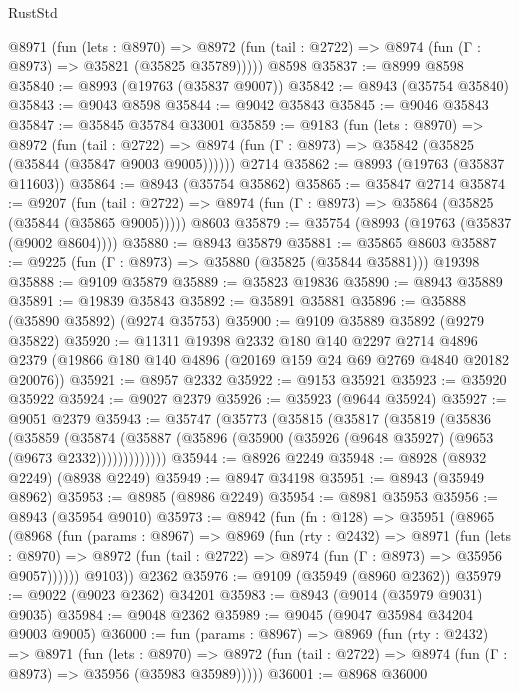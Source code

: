 \begin{lexlean}{RustStd}
\begin{coremodule}
    @8971
      (fun (lets : @8970) =>
      @8972 (fun (tail : @2722) => @8974 (fun (Γ : @8973) => @35821 (@35825 @35789)))))
    @8598
@35837 := @8999 @8598
@35840 := @8993 (@19763 (@35837 @9007))
@35842 := @8943 (@35754 @35840)
@35843 := @9043 @8598
@35844 := @9042 @35843
@35845 := @9046 @35843
@35847 := @35845 @35784 @33001
@35859 := @9183
    (fun (lets : @8970) =>
    @8972
      (fun (tail : @2722) =>
      @8974 (fun (Γ : @8973) => @35842 (@35825 (@35844 (@35847 @9003 @9005))))))
    @2714
@35862 := @8993 (@19763 (@35837 @11603))
@35864 := @8943 (@35754 @35862)
@35865 := @35847 @2714
@35874 := @9207
    (fun (tail : @2722) => @8974 (fun (Γ : @8973) => @35864 (@35825 (@35844 (@35865 @9005)))))
    @8603
@35879 := @35754 (@8993 (@19763 (@35837 (@9002 @8604))))
@35880 := @8943 @35879
@35881 := @35865 @8603
@35887 := @9225 (fun (Γ : @8973) => @35880 (@35825 (@35844 @35881))) @19398
@35888 := @9109 @35879
@35889 := @35823 @19836
@35890 := @8943 @35889
@35891 := @19839 @35843
@35892 := @35891 @35881
@35896 := @35888 (@35890 @35892) (@9274 @35753)
@35900 := @9109 @35889 @35892 (@9279 @35822)
@35920 := @11311
    @19398
    @2332
    @180
    @140
    @2297
    @2714
    @4896
    @2379
    (@19866 @180 @140 @4896 (@20169 @159 @24 @69 @2769 @4840 @20182 @20076))
@35921 := @8957 @2332
@35922 := @9153 @35921
@35923 := @35920 @35922
@35924 := @9027 @2379
@35926 := @35923 (@9644 @35924)
@35927 := @9051 @2379
@35943 := @35747
    (@35773
      (@35815
        (@35817
          (@35819
            (@35836
              (@35859
                (@35874
                  (@35887 (@35896 (@35900 (@35926 (@9648 @35927) (@9653 (@9673 @2332)))))))))))))
@35944 := @8926 @2249
@35948 := @8928 (@8932 @2249) (@8938 @2249)
@35949 := @8947 @34198
@35951 := @8943 (@35949 @8962)
@35953 := @8985 (@8986 @2249)
@35954 := @8981 @35953
@35956 := @8943 (@35954 @9010)
@35973 := @8942
    (fun (fn : @128) =>
    @35951
      (@8965
        (@8968
          (fun (params : @8967) =>
          @8969
            (fun (rty : @2432) =>
            @8971
              (fun (lets : @8970) =>
              @8972 (fun (tail : @2722) => @8974 (fun (Γ : @8973) => @35956 @9057))))))
        @9103))
    @2362
@35976 := @9109 (@35949 (@8960 @2362))
@35979 := @9022 (@9023 @2362) @34201
@35983 := @8943 (@9014 (@35979 @9031) @9035)
@35984 := @9048 @2362
@35989 := @9045 (@9047 @35984 @34204 @9003 @9005)
@36000 := fun (params : @8967) =>
  @8969
    (fun (rty : @2432) =>
    @8971
      (fun (lets : @8970) =>
      @8972 (fun (tail : @2722) => @8974 (fun (Γ : @8973) => @35956 (@35983 @35989)))))
@36001 := @8968 @36000

\end{coremodule}
\end{lexlean}
